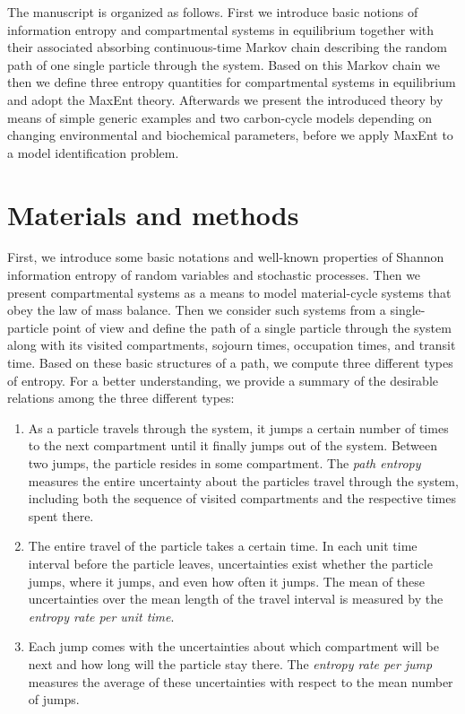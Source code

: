 \documentclass[smallextended]{svjour3}
\begin{document}
The manuscript is organized as follows.
First we introduce basic notions of information entropy and compartmental systems in equilibrium together with their associated absorbing continuous-time Markov chain describing the random path of one single particle through the system.
Based on this Markov chain we then we define three entropy quantities for compartmental systems in equilibrium and adopt the MaxEnt theory.
Afterwards we present the introduced theory by means of simple generic examples and two carbon-cycle models depending on changing environmental and biochemical parameters, before we apply MaxEnt to a model identification problem.


\section{Materials and methods}
First, we introduce some basic notations and well-known properties of Shannon information entropy of random variables and stochastic processes.
Then we present compartmental systems as a means to model material-cycle systems that obey the law of mass balance.
Then we consider such systems from a single-particle point of view and define the path of a single particle through the system along with its visited compartments, sojourn times, occupation times, and transit time.
Based on these basic structures of a path, we compute three different types of entropy.
For a better understanding, we provide a summary of the desirable relations among the three different types:
\begin{enumerate}[(1)]
  \item 	As a particle travels through the system, it jumps a certain number of times to the next compartment until it finally jumps out of the system.
	Between two jumps, the particle resides in some compartment.
  The \emph{path entropy} measures the entire uncertainty about the particles travel through the system, including both the sequence of visited compartments and the respective times spent there.

	\item The entire travel of the particle takes a certain time.
	In each unit time interval before the particle leaves, uncertainties exist whether the particle jumps, where it jumps, and even how often it jumps.
	The mean of these uncertainties over the mean length of the travel interval is measured by the \emph{entropy rate per unit time}.

	\item Each jump comes with the uncertainties about which compartment will be next and how long will the particle stay there.
	The \emph{entropy rate per jump} measures the average of these uncertainties with respect to the mean number of jumps.
\end{enumerate}
\end{document}
